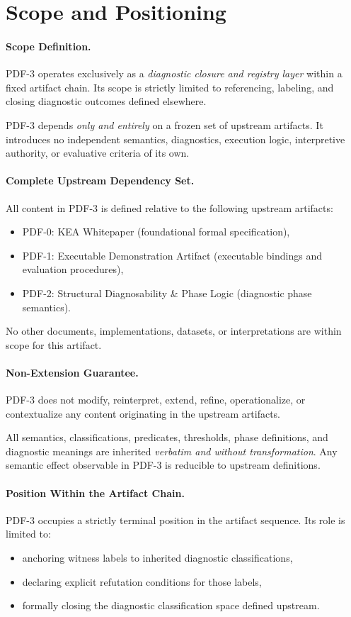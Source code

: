 ﻿\section{Scope and Positioning}

\paragraph{Scope Definition.}
PDF-3 operates exclusively as a \emph{diagnostic closure and registry layer}
within a fixed artifact chain.
Its scope is strictly limited to referencing, labeling, and closing
diagnostic outcomes defined elsewhere.

PDF-3 depends \emph{only and entirely} on a frozen set of upstream artifacts.
It introduces no independent semantics, diagnostics, execution logic,
interpretive authority, or evaluative criteria of its own.

\paragraph{Complete Upstream Dependency Set.}
All content in PDF-3 is defined relative to the following upstream artifacts:
\begin{itemize}
  \item PDF-0: KEA Whitepaper (foundational formal specification),
  \item PDF-1: Executable Demonstration Artifact (executable bindings and evaluation procedures),
  \item PDF-2: Structural Diagnosability \& Phase Logic (diagnostic phase semantics).
\end{itemize}
No other documents, implementations, datasets, or interpretations
are within scope for this artifact.

\paragraph{Non-Extension Guarantee.}
PDF-3 does not modify, reinterpret, extend, refine, operationalize,
or contextualize any content originating in the upstream artifacts.

All semantics, classifications, predicates, thresholds, phase definitions,
and diagnostic meanings are inherited \emph{verbatim and without transformation}.
Any semantic effect observable in PDF-3 is reducible to upstream definitions.

\paragraph{Position Within the Artifact Chain.}
PDF-3 occupies a strictly terminal position in the artifact sequence.
Its role is limited to:
\begin{itemize}
  \item anchoring witness labels to inherited diagnostic classifications,
  \item declaring explicit refutation conditions for those labels,
  \item formally closing the diagnostic classification space defined upstream.
\end{itemize}

